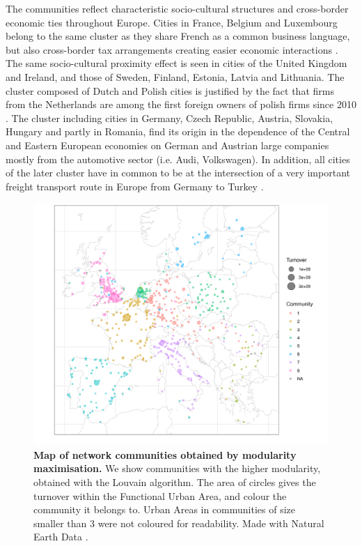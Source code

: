 \documentclass[10pt,letterpaper]{article}
\begin{document}
The communities reflect characteristic socio-cultural structures and cross-border economic ties throughout Europe. Cities in France, Belgium and Luxembourg belong to the same cluster as they share French as a common business language, but also cross-border tax arrangements creating easier economic interactions \cite{DecovilleDurand2019}. The same socio-cultural proximity effect is seen in cities of the United Kingdom and Ireland, and those of Sweden, Finland, Estonia, Latvia and Lithuania. The cluster composed of Dutch and Polish cities is justified by the fact that firms from the Netherlands are among the first foreign owners of polish firms since 2010 \cite{2020Zdanowska}. The cluster including cities in Germany, Czech Republic, Austria, Slovakia, Hungary and partly in Romania, find its origin in the dependence of the Central and Eastern European economies on German and Austrian large companies mostly from the automotive sector (i.e. Audi, Volkswagen). In addition, all cities of the later cluster have in common to be at the intersection of a very important freight transport route in Europe from Germany to Turkey \cite{Zdanowska2017}. 


\begin{figure}
    \begin{center}
    \includegraphics[width=\linewidth]{figures/Fig2.png}
    \end{center}
    \vspace{2cm}
    \caption{{\bf Map of network communities obtained by modularity maximisation.} We show communities with the higher modularity, obtained with the Louvain algorithm. The area of circles gives the turnover within the Functional Urban Area, and colour the community it belongs to. Urban Areas in communities of size smaller than 3 were not coloured for readability. Made with Natural Earth Data \cite{naturalearth}.}
    \label{fig:fig2}
\end{figure}
\end{document}
